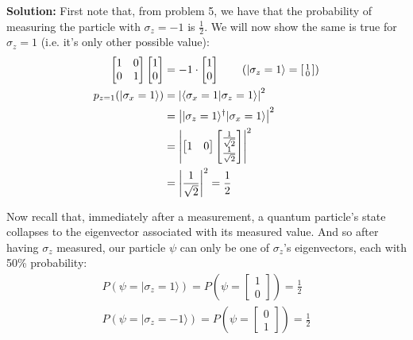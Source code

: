 \documentclass{article}
\newcommand{\icol}[1]{%
  \begin{bsmallmatrix}#1\end{bsmallmatrix}%
}
\begin{document}
\noindent\textbf{Solution:} First note that, from problem 5, we have that the probability of measuring the particle with $\sigma_z=-1$ is $\frac{1}{2}$. We will now show the same is true for $\sigma_z=1$ (i.e. it's only other possible value):
\begin{align*}
    \begin{bmatrix}
        1&0\\0&1
    \end{bmatrix}\begin{bmatrix}
        1\\0
    \end{bmatrix}&=-1\cdot\begin{bmatrix}
        1\\0
    \end{bmatrix}\tag{$|\sigma_z=1\rangle=\icol{1\\0}$}\\
    p_{z=1}(|\sigma_x=1\rangle)&=\left|\langle\sigma_x=1|\sigma_z=1\rangle\right|^2\\
    &=\left||\sigma_z=1\rangle^\dagger|\sigma_x=1\rangle\right|^2\\
    &=\left|\begin{bmatrix}
        1&0
    \end{bmatrix}\begin{bmatrix}
        \frac{1}{\sqrt{2}}\\\frac{1}{\sqrt{2}}
    \end{bmatrix}\right|^2\\
    &=\left|\frac{1}{\sqrt{2}}\right|^2=\frac{1}{2}
\end{align*}

Now recall that, immediately after a measurement, a quantum particle's state collapses to the eigenvector associated with its measured value. And so after having $\sigma_z$ measured, our particle $\psi$ can only be one of $\sigma_z$'s eigenvectors, each with 50\% probability:
\begin{align*}
    P(\psi=|\sigma_z=1\rangle)=P\left(\psi=\begin{bmatrix}
        1\\0
    \end{bmatrix}\right)=\frac{1}{2}\\
    P(\psi=|\sigma_z=-1\rangle)=P\left(\psi=\begin{bmatrix}
        0\\1
    \end{bmatrix}\right)=\frac{1}{2}
\end{align*}
\end{document}

